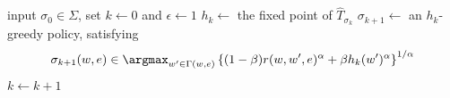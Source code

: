 \begin{algorithm}
    \DontPrintSemicolon
    input $\sigma_0 \in \Sigma$, set $k \leftarrow 0$ and $\epsilon \leftarrow 1$ \;
    {
        $h_k \leftarrow $ the fixed point of $\hat T_{\sigma_k}$ \;
        $\sigma_{k+1} \leftarrow $ an $h_k$-greedy policy, satisfying
        \begin{equation*}
            \sigma_{k+1}(w, e) \in \argmax_{w' \in \Gamma(w, e)}
            \left\{
                (1-\beta) r(w, w', e)^\alpha + \beta h_k(w')^\alpha
            \right\}^{1/\alpha}
        \end{equation*}
        \;
        \vspace{-1em}
        $k \leftarrow k + 1$ \;
    }
    \caption{\label{algo:hpowb} Solving via Howard policy iteration}
\end{algorithm}
